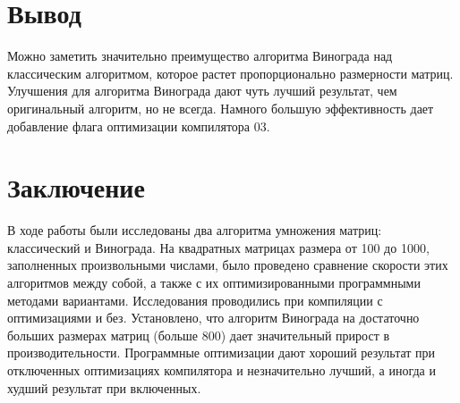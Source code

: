 \documentclass[a4paper, 14pt]{article}
\begin{document}
	
	\newpage
	\section{Вывод}
	
	Можно заметить значительно преимущество алгоритма Винограда над классическим алгоритмом, которое растет пропорционально размерности матриц. Улучшения для алгоритма Винограда дают чуть лучший результат, чем оригинальный алгоритм, но не всегда.
	Намного большую эффективность дает добавление флага оптимизации компилятора 03.
	
	
	\newpage
	\section{Заключение}
	
	В ходе работы были исследованы два алгоритма умножения матриц: классический и Винограда. На квадратных матрицах размера от 100 до 1000, заполненных произвольными числами, было проведено сравнение скорости этих алгоритмов между собой, а также с их оптимизированными программными методами вариантами. Исследования проводились при компиляции с оптимизациями и без. Установлено, что алгоритм Винограда на достаточно больших размерах матриц (больше 800) дает значительный прирост в производительности. Программные оптимизации дают хороший результат при отключенных оптимизациях компилятора и незначительно лучший, а иногда и худший результат при включенных.
	
\end{document}
